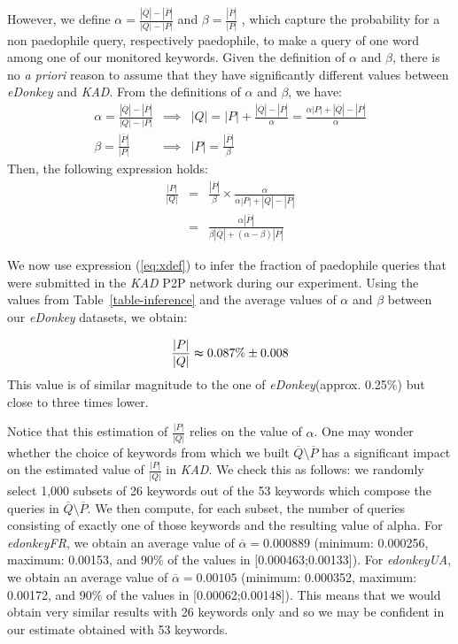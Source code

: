 \documentclass[a4paper,oneside,12pt]{article}
\newcommand{\edonkey}{{\em eDonkey}\xspace}
\newcommand{\edonkeydsfr}{{\em edonkeyFR}\xspace}
\newcommand{\edonkeydsua}{{\em edonkeyUA}\xspace}
\newcommand{\kad}{{\em KAD}\xspace}
\begin{document}
However, we define 
$\alpha = \frac{|\overline{Q}|-|\overline{P}|}{|Q|-|P|}$ 
and 
$\beta = \frac{|\overline{P}|}{|P|}$
, which capture the probability for a non paedophile query, respectively paedophile, to make a query of one word among one of our monitored keywords. Given the definition of $\alpha$ and $\beta$, there is no {\em a priori} reason to assume that they have significantly different values between \edonkey and \kad. From the definitions of $\alpha$ and $\beta$, we have:
\begin{eqnarray*}
  \alpha = \frac{|\overline{Q}|-|\overline{P}|}{|Q|-|P|} & \implies & |Q| = |P| + \frac{|\overline{Q}|-|\overline{P}|}{\alpha} = \frac{\alpha |P| + |\overline{Q}|-|\overline{P}|}{\alpha}\\
\beta = \frac{|\overline{P}|}{|P|} & \implies & |P| = \frac{|\overline{P}|}{\beta} 
\label{eq:xf}
\end{eqnarray*}
Then, the following expression holds: 
\begin{eqnarray}
  \frac{|P|}{|Q|} & = & \frac{|\overline{P}|}{\beta} \times \frac{\alpha}{\alpha |P| + |\overline{Q}|-|\overline{P}|} \nonumber\\
                  & = & \frac{\alpha |\overline{P}|}{\beta |\overline{Q}| + (\alpha - \beta) |\overline{P}|}  
\label{eq:xdef}
\end{eqnarray}

We now use expression (\ref{eq:xdef}) to infer the fraction of paedophile queries that were submitted in the \kad P2P network during our experiment. Using the values from Table~\ref{table-inference} and the average values of $\alpha$ and $\beta$ between our \edonkey datasets, we obtain: 

$$\frac{|P|}{|Q|} \thickapprox 0.087\% \pm 0.008$$
This value is of similar magnitude to the one of \edonkey (approx.
0.25\%) but close to three times lower. 

Notice that this estimation of $\frac{|P|}{|Q|}$ relies on the value of $\alpha$. One may wonder whether the choice of keywords from which we built $\overline{Q} \setminus \overline{P}$ has a significant impact on the estimated value of $\frac{|P|}{|Q|}$ in \kad. We check this as follows: we randomly select 1,000 subsets of 26 keywords out of the 53 keywords which compose the queries in $\overline{Q} \setminus \overline{P}$. We then compute, for each subset, the number of queries consisting of exactly one of those keywords and the resulting value of alpha. For \edonkeydsfr, we obtain an average value of $\overline{\alpha} = 0.000889 $ (minimum: 0.000256, maximum: 0.00153, and 90\% of the values in [0.000463;0.00133]). For \edonkeydsua, we obtain an average value of $\overline{\alpha} = 0.00105$ (minimum: 0.000352, maximum: 0.00172, and 90\% of the values in [0.00062;0.00148]). This means that we would obtain very similar results with 26 keywords only and so we may be confident in our estimate obtained with 53 keywords. 
\end{document}
